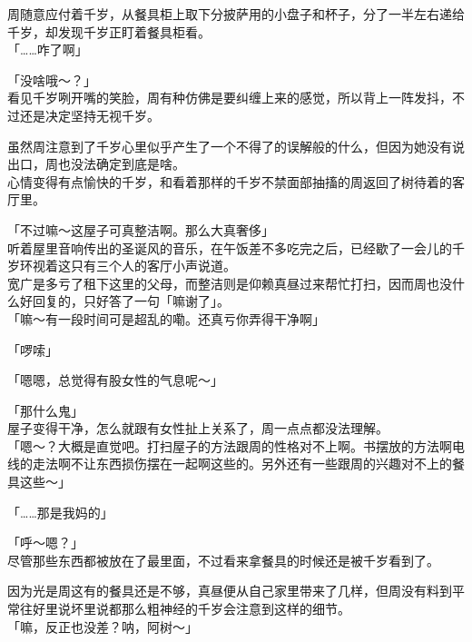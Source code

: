 周随意应付着千岁，从餐具柜上取下分披萨用的小盘子和杯子，分了一半左右递给千岁，却发现千岁正盯着餐具柜看。\\

「……咋了啊」

「没啥哦～？」\\

看见千岁咧开嘴的笑脸，周有种仿佛是要纠缠上来的感觉，所以背上一阵发抖，不过还是决定坚持无视千岁。

虽然周注意到了千岁心里似乎产生了一个不得了的误解般的什么，但因为她没有说出口，周也没法确定到底是啥。\\

心情变得有点愉快的千岁，和看着那样的千岁不禁面部抽搐的周返回了树待着的客厅里。\\

\vspace{2\baselineskip}

「不过嘛～这屋子可真整洁啊。那么大真奢侈」\\

听着屋里音响传出的圣诞风的音乐，在午饭差不多吃完之后，已经歇了一会儿的千岁环视着这只有三个人的客厅小声说道。\\

宽广是多亏了租下这里的父母，而整洁则是仰赖真昼过来帮忙打扫，因而周也没什么好回复的，只好答了一句「嘛谢了」。\\

「嘛～有一段时间可是超乱的嘞。还真亏你弄得干净啊」

「啰嗦」

「嗯嗯，总觉得有股女性的气息呢～」

「那什么鬼」\\

屋子变得干净，怎么就跟有女性扯上关系了，周一点点都没法理解。\\

「嗯～？大概是直觉吧。打扫屋子的方法跟周的性格对不上啊。书摆放的方法啊电线的走法啊不让东西损伤摆在一起啊这些的。另外还有一些跟周的兴趣对不上的餐具这些～」

「……那是我妈的」

「呼～嗯？」\\

尽管那些东西都被放在了最里面，不过看来拿餐具的时候还是被千岁看到了。

因为光是周这有的餐具还是不够，真昼便从自己家里带来了几样，但周没有料到平常往好里说坏里说都那么粗神经的千岁会注意到这样的细节。\\

「嘛，反正也没差？呐，阿树～」\\

